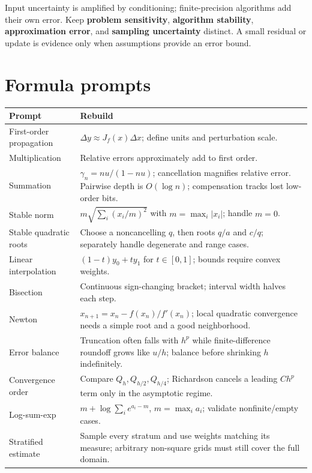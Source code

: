 Input uncertainty is amplified by conditioning; finite-precision algorithms add their own error. Keep \textbf{problem sensitivity}, \textbf{algorithm stability}, \textbf{approximation error}, and \textbf{sampling uncertainty} distinct. A small residual or update is evidence only when assumptions provide an error bound.

\section{Formula prompts}\label{appendix-cb5af353ef77-formula-prompts-1}

{\def\LTcaptype{none} %
\begin{longtable}[]{@{}
  >{\raggedright\arraybackslash}p{}
  >{\raggedright\arraybackslash}p{}@{}}
\toprule\noalign{}
\begin{minipage}[b]{\linewidth}\raggedright
Prompt
\end{minipage} & \begin{minipage}[b]{\linewidth}\raggedright
Rebuild
\end{minipage} \\
\midrule\noalign{}
\endhead
\bottomrule\noalign{}
\endlastfoot
First-order propagation & \(\Delta y\approx J_f(x)\Delta x\); define units and perturbation scale. \\
Multiplication & Relative errors approximately add to first order. \\
Summation & \(\gamma_n=nu/(1-nu)\); cancellation magnifies relative error. Pairwise depth is \(O(\log n)\); compensation tracks lost low-order bits. \\
Stable norm & \(m\sqrt{\sum_i(x_i/m)^2}\) with \(m=\max_i|x_i|\); handle \(m=0\). \\
Stable quadratic roots & Choose a noncancelling \(q\), then roots \(q/a\) and \(c/q\); separately handle degenerate and range cases. \\
Linear interpolation & \((1-t)y_0+ty_1\) for \(t\in[0,1]\); bounds require convex weights. \\
Bisection & Continuous sign-changing bracket; interval width halves each step. \\
Newton & \(x_{n+1}=x_n-f(x_n)/f'(x_n)\); local quadratic convergence needs a simple root and a good neighborhood. \\
Error balance & Truncation often falls with \(h^p\) while finite-difference roundoff grows like \(u/h\); balance before shrinking \(h\) indefinitely. \\
Convergence order & Compare \(Q_h,Q_{h/2},Q_{h/4}\); Richardson cancels a leading \(Ch^p\) term only in the asymptotic regime. \\
Log-sum-exp & \(m+\log\sum_i e^{a_i-m}\), \(m=\max_i a_i\); validate nonfinite/empty cases. \\
Stratified estimate & Sample every stratum and use weights matching its measure; arbitrary non-square grids must still cover the full domain. \\
\end{longtable}
}

